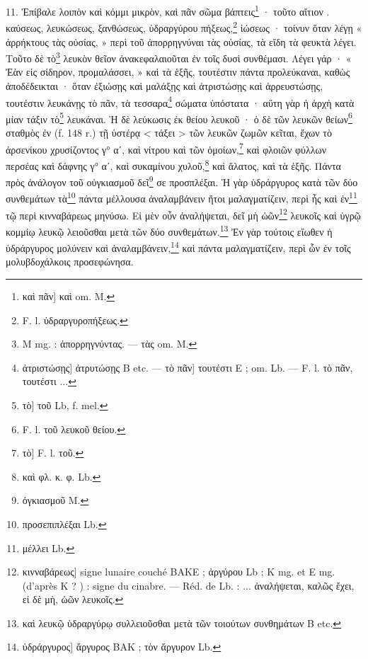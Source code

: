 \documentclass[landscape, a4paper, 11pt, oneside, polutonikogreek, french]{article}
\begin{document}
11. Ἐπίβαλε λοιπὸν καὶ κόμμι μικρὸν, καὶ πᾶν σῶμα βάπτεις\footnote{καὶ πᾶν] καὶ om. M.} · τοῦτο αἴτιον . καύσεως, λευκώσεως, ξανθώσεως, ὑδραργύρου πήξεως,\footnote{F. l. ὑδραργυροπήξεως.} ἰώσεως · τοίνυν ὅταν λέγῃ « ἀρρήκτους τὰς οὐσίας, » περὶ τοῦ ἀπορρηγνύναι τὰς οὐσίας, τὰ εἴδη τὰ φευκτὰ λέγει. Τοῦτο δὲ τὸ\footnote{M mg. : ἀπορρηγνύντας. --- τὰς om. M.} λευκὸν θεῖον ἀνακεφαλαιοῦται ἐν τοῖς δυσὶ συνθέμασι. Λέγει γάρ · « Ἐὰν εἰς σίδηρον, προμαλάσσει, » καὶ τὰ ἑξῆς, τουτέστιν πάντα προλεύκαναι, καθὼς ἀποδέδεικται · ὅταν ἐξιώσῃς καὶ μαλάξῃς καὶ ἀτριστώσῃς καὶ ἀρρευστώσῃς, τουτέστιν λευκάνῃς τὸ πᾶν, τὰ τεσσαρα\footnote{ἀτριστώσῃς] ἀτρυτώσῃς B etc. --- τὸ πᾶν] τουτέστι E ; om. Lb. --- F. l. τὸ πᾶν, τουτέστι ...} σώματα ὑπόστατα · αὕτη γὰρ ἡ ἀρχὴ κατὰ μίαν τάξιν τὸ\footnote{τὸ] τοῦ Lb, f. mel.} λευκάναι. Ἡ δὲ λεύκωσις ἐκ θείου λευκοῦ · ὁ δὲ τῶν λευκῶν θείων\footnote{F. l. τοῦ λευκοῦ θείου.} σταθμὸς ἐν (f. 148 r.) τῇ ὑστέρᾳ < τάξει > τῶν λευκῶν ζωμῶν κεῖται, ἔχων τὸ ἀρσενίκου χρυσίζοντος γ° αʹ, καὶ νίτρου καὶ τῶν ὁμοίων,\footnote{τὸ] F. l. τοῦ.} καὶ φλοιῶν φύλλων περσέας καὶ δάφνης γ° αʹ, καὶ συκαμίνου χυλοῦ,\footnote{καὶ φλ. κ. φ. Lb.} καὶ ἅλατος, καὶ τὰ ἑξῆς. Πάντα πρὸς ἀνάλογον τοῦ οὐγκιασμοῦ δεῖ\footnote{ὀγκιασμοῦ M.} σε προσπλέξαι. Ἡ γὰρ ὑδράργυρος κατὰ τῶν δύο συνθεμάτων τὰ\footnote{προσεπιπλέξαι Lb.} πάντα μέλλουσα ἀναλαμβάνειν ἤτοι μαλαγματίζειν, περὶ ἧς καὶ ἐν\footnote{μέλλει Lb.} τῷ περὶ κινναβάρεως μηνύσω. Εἰ μὲν οὖν ἀναλήψεται, δεῖ μὴ ὠῶν\footnote{κινναβάρεως] signe lunaire couché BAKE ; ἀργύρου Lb ; K mg. et E mg. (d'après K ? ) : signe du cinabre. --- Réd. de Lb. : ... ἀναλήψεται, καλῶς ἔχει, εἰ δὲ μὴ, ὠῶν λευκοῖς.} λευκοῖς καὶ ὑγρῷ κομμίῳ λευκῷ λειοῦσθαι μετὰ τῶν δύο συνθεμάτων.\footnote{καὶ λευκῷ ὑδραργύρῳ συλλειοῦσθαι μετὰ τῶν τοιούτων συνθημάτων B etc.} Ἐν γὰρ τούτοις εἴωθεν ἡ ὑδράργυρος μολύνειν καὶ ἀναλαμβάνειν,\footnote{ὑδράργυρος] ἄργυρος BAK ; τὸν ἄργυρον Lb.} καὶ πάντα μαλαγματίζειν, περὶ ὧν ἐν τοῖς μολυβδοχάλκοις προσεφώνησα.
\end{document}
